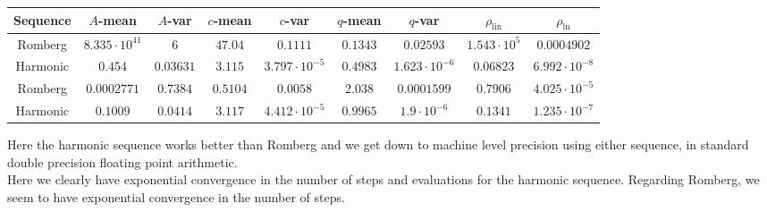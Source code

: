 \begin{table}[H]
    \centering
    \small
    \begin{tabular}{c||c|c|c|c|c|c|c|c}
Sequence & \(A\)-mean & \(A\)-var & \(c\)-mean & \(c\)-var & \(q\)-mean & \(q\)-var & \(\rho_{\operatorname{lin}}\) & \(\rho_{\ln}\)\\\hline
\rowcolor{red}
Romberg & \(8.335\cdot 10^{41}\) & \(6\) & \(47.04\) & \(0.1111\) & \(0.1343\) & \(0.02593\) & \(1.543\cdot 10^5\) & \(0.0004902\) \\
\rowcolor{green}
Harmonic & \(0.454\) & \(0.03631\) & \(3.115\) & \(3.797\cdot 10^{-5}\) & \(0.4983\) & \(1.623\cdot 10^{-6}\) & \(0.06823\) & \(6.992\cdot 10^{-8}\) \\
\rowcolor{green}
Romberg & \(0.0002771\) & \(0.7384\) & \(0.5104\) & \(0.0058\) & \(2.038\) & \(0.0001599\) & \(0.7906\) & \(4.025\cdot 10^{-5}\) \\
\rowcolor{green}
Harmonic & \(0.1009\) & \(0.0414\) & \(3.117\) & \(4.412\cdot 10^{-5}\) & \(0.9965\) & \(1.9\cdot 10^{-6}\) & \(0.1341\) & \(1.235\cdot 10^{-7}\) \\
    \end{tabular}
    \label{tab:my_label}
\end{table}

Here the harmonic sequence works better than Romberg and we get down to machine level precision using either sequence, in standard double precision floating point arithmetic.\\

Here we clearly have exponential convergence in the number of steps and evaluations for the harmonic sequence. Regarding Romberg, we seem to have exponential convergence in the number of steps.


